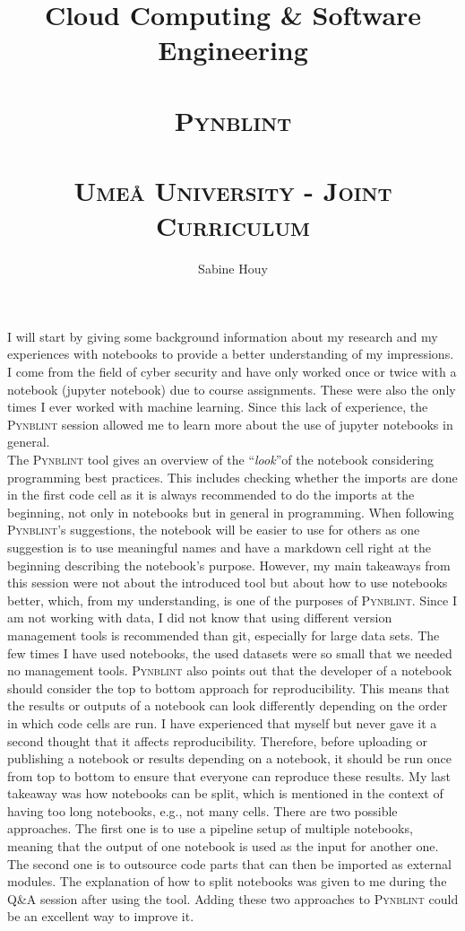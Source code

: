 \documentclass[11pt,a4paper]{article}
\title{%
  Cloud Computing \& Software Engineering \\~\\
  \textsc{Pynblint}\\~\\
  \small\textsc{Umeå University - Joint Curriculum}}
\author{Sabine Houy}
\date{}
\begin{document}
\maketitle

I will start by giving some background information about my research and my experiences with notebooks to provide a better understanding of my impressions. I come from the field of cyber security and have only worked once or twice with a notebook (\textsf{jupyter notebook}) due to course assignments. These were also the only times I ever worked with machine learning. Since this lack of experience, the \textsc{Pynblint} session allowed me to learn more about the use of \textsf{jupyter notebooks} in general.\\

The \textsc{Pynblint} tool gives an overview of the \textquotedblleft\textit{look}\textquotedblright of the notebook considering programming best practices. This includes checking whether the imports are done in the first code cell as it is always recommended to do the imports at the beginning, not only in notebooks but in general in programming. When following \textsc{Pynblint}'s suggestions, the notebook will be easier to use for others as one suggestion is to use meaningful names and have a markdown cell right at the beginning describing the notebook's purpose. However, my main takeaways from this session were not about the introduced tool but about how to use notebooks better, which, from my understanding, is one of the purposes of \textsc{Pynblint}. Since I am not working with data, I did not know that using different version management tools is recommended than git, especially for large data sets. The few times I have used notebooks, the used datasets were so small that we needed no management tools. \textsc{Pynblint} also points out that the developer of a notebook should consider the top to bottom approach for reproducibility. This means that the results or outputs of a notebook can look differently depending on the order in which code cells are run. I have experienced that myself but never gave it a second thought that it affects reproducibility. Therefore, before uploading or publishing a notebook or results depending on a notebook, it should be run once from top to bottom to ensure that everyone can reproduce these results. My last takeaway was how notebooks can be split, which is mentioned in the context of having too long notebooks, e.g., not many cells. There are two possible approaches. The first one is to use a pipeline setup of multiple notebooks, meaning that the output of one notebook is used as the input for another one. The second one is to outsource code parts that can then be imported as external modules. The explanation of how to split notebooks was given to me during the Q\&A session after using the tool. Adding these two approaches to \textsc{Pynblint} could be an excellent way to improve it.\\
\end{document}
